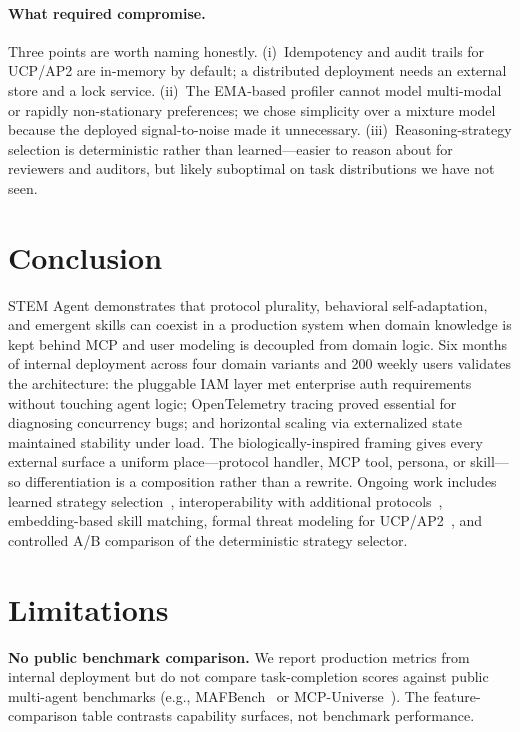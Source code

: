 \documentclass[11pt]{article}
\begin{document}
\paragraph{What required compromise.} Three points are worth naming honestly. (i)~Idempotency and audit trails for UCP/AP2 are in-memory by default; a distributed deployment needs an external store and a lock service. (ii)~The EMA-based profiler cannot model multi-modal or rapidly non-stationary preferences; we chose simplicity over a mixture model because the deployed signal-to-noise made it unnecessary. (iii)~Reasoning-strategy selection is deterministic rather than learned---easier to reason about for reviewers and auditors, but likely suboptimal on task distributions we have not seen.

\section{Conclusion}
\label{sec:conclusion}

STEM Agent demonstrates that protocol plurality, behavioral self-adaptation, and emergent skills can coexist in a production system when domain knowledge is kept behind MCP and user modeling is decoupled from domain logic. Six months of internal deployment across four domain variants and 200 weekly users validates the architecture: the pluggable IAM layer met enterprise auth requirements without touching agent logic; OpenTelemetry tracing proved essential for diagnosing concurrency bugs; and horizontal scaling via externalized state maintained stability under load. The biologically-inspired framing gives every external surface a uniform place---protocol handler, MCP tool, persona, or skill---so differentiation is a composition rather than a rewrite. Ongoing work includes learned strategy selection~\citep{alomrani2025reasoning}, interoperability with additional protocols~\citep{chang2025anp, nie2026awcp}, embedding-based skill matching, formal threat modeling for UCP/AP2~\citep{anbiaee2026security}, and controlled A/B comparison of the deterministic strategy selector.

\section*{Limitations}

\textbf{No public benchmark comparison.} We report production metrics from internal deployment but do not compare task-completion scores against public multi-agent benchmarks (e.g., MAFBench~\citep{orogat2026mafbench} or MCP-Universe~\citep{luo2025mcpuniverse}). The feature-comparison table contrasts capability surfaces, not benchmark performance.
\end{document}
